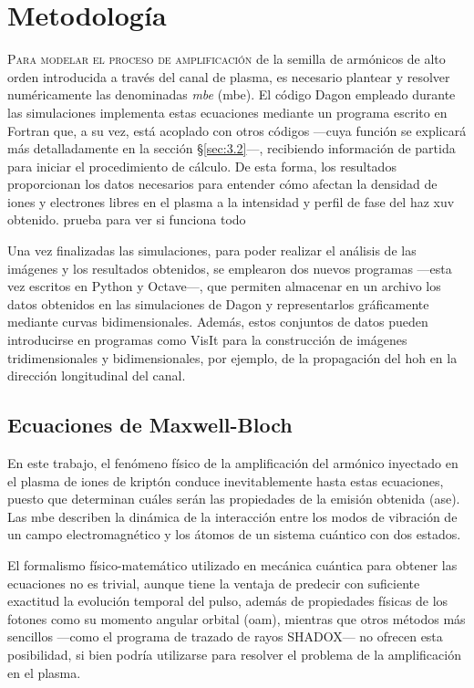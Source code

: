 \chapter{Metodología}\label{cap:3}
\lettrine{P}{ara modelar el proceso de amplificación} de la semilla de armónicos de alto orden introducida a través del canal de plasma, es necesario plantear y resolver numéricamente las denominadas \emph{\acrlong{mbe}} (\acrshort{mbe}). El código Dagon empleado durante las simulaciones implementa estas ecuaciones mediante un programa escrito en Fortran que, a su vez, está acoplado con otros códigos ---cuya función se explicará más detalladamente en la sección \S\ref{sec:3.2}---, recibiendo información de partida para iniciar el procedimiento de cálculo. De esta forma, los resultados proporcionan los datos necesarios para entender cómo afectan la densidad de iones y electrones libres en el plasma a la intensidad y perfil de fase del haz \acrshort{xuv} obtenido. prueba para ver si funciona todo

Una vez finalizadas las simulaciones, para poder realizar el análisis de las imágenes y los resultados obtenidos, se emplearon dos nuevos programas ---esta vez escritos en Python y Octave---, que permiten almacenar en un archivo los datos obtenidos en las simulaciones de Dagon y representarlos gráficamente mediante curvas bidimensionales. Además, estos conjuntos de datos pueden introducirse en programas como VisIt para la construcción de imágenes tridimensionales y bidimensionales, por ejemplo, de la propagación del \acrshort{hoh} en la dirección longitudinal del canal.

\section{Ecuaciones de Maxwell-Bloch}\label{sec:3.1}
En este trabajo, el fenómeno físico de la amplificación del armónico inyectado en el plasma de iones de kriptón conduce inevitablemente hasta estas ecuaciones, puesto que determinan cuáles serán las propiedades de la emisión obtenida (\acrshort{ase}). Las \acrshort{mbe} describen la dinámica de la interacción entre los modos de vibración de un campo electromagnético y los átomos de un sistema cuántico con dos estados. 

El formalismo físico-matemático utilizado en mecánica cuántica para obtener las ecuaciones no es trivial\autocite{cohen-tannoudjiQuantumMechanicsVolume2019,cohen-tannoudjiQuantumMechanicsVolume2019a,Sakurai2020,milonniLasers1988}, aunque tiene la ventaja de predecir con suficiente exactitud la evolución temporal del pulso, además de propiedades físicas de los fotones como su momento angular orbital (\acrshort{oam}), mientras que otros métodos más sencillos ---como el programa de trazado de rayos SHADOX--- no ofrecen esta posibilidad, si bien podría utilizarse para resolver el problema de la amplificación en el plasma.

